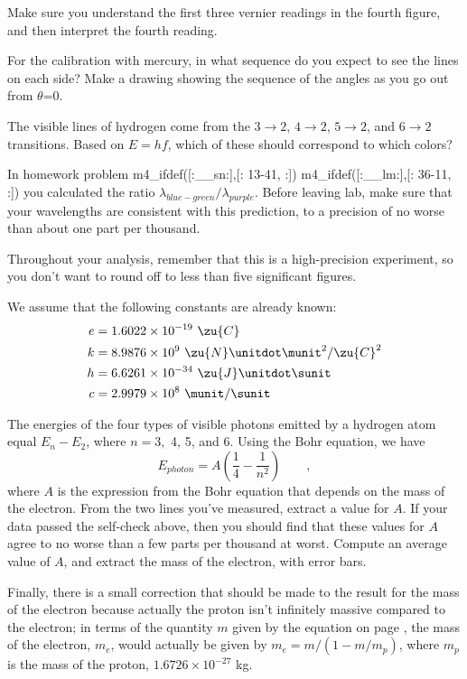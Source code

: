 \prelabquestion  Make sure you understand the first three vernier
readings in the fourth figure, and then interpret the fourth reading.

\prelabquestion  For the calibration with mercury,
in what sequence do you expect to see the lines on
each side? Make a drawing showing the sequence of the angles
as you go out from $\theta $=0.

\prelabquestion
The visible lines of hydrogen come from the $3\rightarrow2$,
$4\rightarrow2$, $5\rightarrow2$, and $6\rightarrow2$
transitions. Based on $E=hf$, which of these should
correspond to which colors?

\selfcheck

In homework problem
m4_ifdef([:__sn:],[:%
13-41,%
:])%
m4_ifdef([:__lm:],[:%
36-11,%
:])%
you calculated the ratio $\lambda_{blue-green}/\lambda_{purple}$.
Before leaving lab, make sure that your wavelengths are consistent with this prediction,
to a precision of no worse than about one part per thousand.

\analysis

Throughout your analysis, remember that this is a high-precision
experiment, so you don't want to round off to less than five
significant figures.

We assume
that the following constants are already known:
\begin{align*}
  e	&= 1.6022\times10^{-19}\ \zu{C}\\
  k	&= 8.9876\times10^9\ \zu{N}\unitdot\munit^2/\zu{C}^2 \\
  h	&= 6.6261\times10^{-34}\ \zu{J}\unitdot\sunit \\
  c     &= 2.9979\times10^8\ \munit/\sunit
\end{align*}

The energies of the four types of visible photons emitted by
a hydrogen atom equal $E_n-E_2$, where $n=3,$ 4, 5, and 6.
Using the Bohr equation, we have
\begin{equation*}
  E_{photon} = A\left(\frac{1}{4}-\frac{1}{n^2}\right) \qquad ,
\end{equation*}
where $A$ is the expression from the Bohr equation that depends
on the mass of the electron. From the two lines you've measured,
extract a value for $A$. If your data passed the self-check above, then
you should find that these values for $A$ agree
to no worse than a few parts per thousand at worst.
Compute an average value of $A$, and extract the mass of the electron,
with error bars.

Finally, there is a small correction that should be made to the result
for the mass of the electron because actually the proton isn't infinitely
massive compared to the electron; in terms of the quantity $m$ given by the
equation on page \pageref{bohr-equation}, the mass of the electron, $m_e$, would
actually be given by $m_e=m/(1-m/m_p)$, where $m_p$ is the mass of the proton,
$1.6726\times10^{-27}$ kg.
